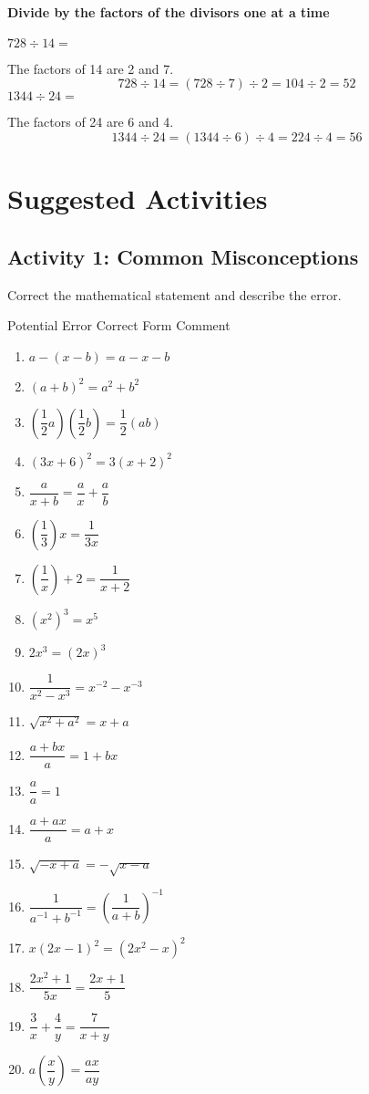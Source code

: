 \paragraph*{Divide by the factors of the divisors one at a time}
\begin{example}
\Item $728\div 14=$

The factors of 14 are 2 and 7.
\begin{equation*}
728 \div 14 = (728 \div 7) \div 2 = 104 \div 2 = 52
\end{equation*}
\Item $1344\div 24=$

The factors of 24 are 6 and 4.
\begin{equation*}
1344 \div 24 = (1344 \div 6) \div 4 = 224 \div 4 = 56
\end{equation*}
\end{example}
\section*{Suggested Activities}
\subsection*{Activity 1: Common Misconceptions}
Correct the mathematical statement and describe the error.

Potential Error \hfil Correct Form \hfil Comment
\begin{enumerate}
\item $a-(x-b)=a-x-b$
\item $(a+b)^2=a^2+b^2$
\item $\left(\dfrac{1}{2}a\right)\left(\dfrac{1}{2}b\right)=\dfrac{1}{2}(ab)$
\item $(3x+6)^2=3(x+2)^2$
\item $\dfrac{a}{x+b}=\dfrac{a}{x}+\dfrac{a}{b}$
\item $\left(\dfrac{1}{3}\right)x=\dfrac{1}{3x}$
\item $\left(\dfrac{1}{x}\right)+2=\dfrac{1}{x+2}$
\item $(x^2)^3=x^5$
\item $2x^3=(2x)^3$
\item $\dfrac{1}{x^2-x^3}=x^{-2}-x^{-3}$
\item $\sqrt{x^2+a^2}=x+a$
\item $\dfrac{a+bx}{a}=1+bx$
\item $\dfrac{a}{a}=1$
\item $\dfrac{a+ax}{a}=a+x$
\item $\sqrt{-x+a}=-\sqrt{x-a}$
\item $\dfrac{1}{a^{-1}+b^{-1}}=\left(\dfrac{1}{a+b}\right)^{-1}$
\item $x(2x-1)^2=(2x^2-x)^2$
\item $\dfrac{2x^2+1}{5x}=\dfrac{2x+1}{5}$
\item $\dfrac{3}{x}+\dfrac{4}{y}=\dfrac{7}{x+y}$
\item $a\left(\dfrac{x}{y}\right)=\dfrac{ax}{ay}$
\end{enumerate}
